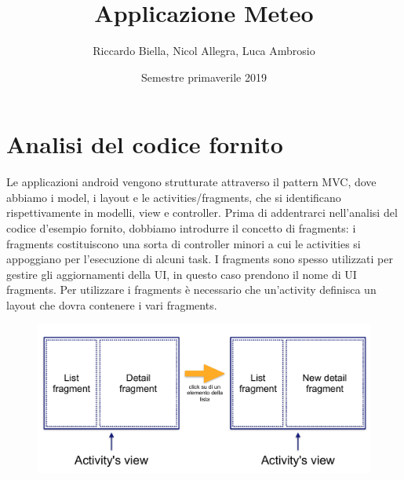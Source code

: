 \documentclass{article}
\title{\Huge Applicazione Meteo \vspace{1cm}}
\author{Riccardo Biella, Nicol Allegra, Luca Ambrosio}
\date{Semestre primaverile 2019}
\begin{document}
\maketitle
\thispagestyle{empty}
\pagebreak


\tableofcontents
\lstset{language=C++}
\pagebreak

\section{Analisi del codice fornito}
Le applicazioni android vengono strutturate attraverso il pattern MVC, dove abbiamo i model, i layout e le activities/fragments, che si identificano rispettivamente in modelli, view e controller.
Prima di addentrarci nell'analisi del codice d'esempio fornito, dobbiamo introdurre il concetto di fragments: i fragments costituiscono una sorta di controller minori a cui le activities si appoggiano per l'esecuzione di alcuni task.
I fragments sono spesso utilizzati per gestire gli aggiornamenti della UI, in questo caso prendono il nome di UI fragments.
Per utilizzare i fragments è necessario che un'activity definisca un layout che dovra contenere i vari fragments.

\begin{figure}[H]
    \center
    \includegraphics[scale=0.25]{images/fig1.png}
\end{figure}
\end{document}
